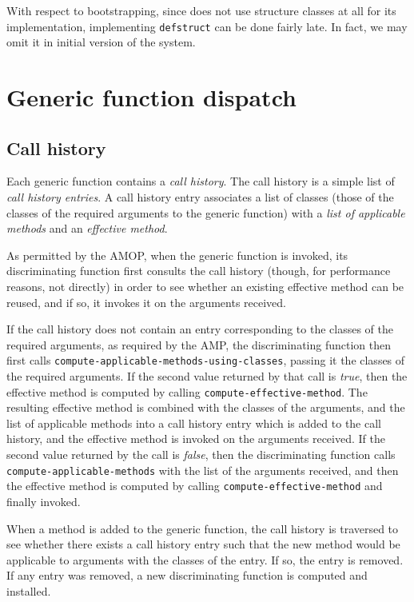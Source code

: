 With respect to bootstrapping, since \sysname{} does not use structure
classes at all for its implementation, implementing \texttt{defstruct}
can be done fairly late.  In fact, we may omit it in initial version
of the system. 

\section{Generic function dispatch}
\label{sec-generic-function-dispatch}

\subsection{Call history}
\label{sec-generic-function-dispatch-call-history}

Each generic function contains a \emph{call history}.  The call
history is a simple list of \emph{call history entries}.  A call
history entry associates a list of classes (those of the classes of
the required arguments to the generic function) with a \emph{list of
  applicable methods} and an \emph{effective method}.

As permitted by the AMOP, when the generic function is invoked, its
discriminating function first consults the call history (though, for
performance reasons, not directly) in order to see whether an existing
effective method can be reused, and if so, it invokes it on the
arguments received.

If the call history does not contain an entry corresponding to the
classes of the required arguments, as required by the AMP, the
discriminating function then first calls
\texttt{compute-applicable-methods-using-classes}, passing it the
classes of the required arguments.  If the second value returned by
that call is \textit{true}, then the effective method is computed by
calling \texttt{compute-effective-method}.  The resulting effective
method is combined with the classes of the arguments, and the list of
applicable methods into a call history entry which is added to the
call history, and the effective method is invoked on the arguments
received.  If the second value returned by the call is \textit{false},
then the discriminating function calls
\texttt{compute-applicable-methods} with the list of the arguments
received, and then the effective method is computed by calling
\texttt{compute-effective-method} and finally invoked.

When a method is added to the generic function, the call history is
traversed to see whether there exists a call history entry such that
the new method would be applicable to arguments with the classes of
the entry.  If so, the entry is removed.  If any entry was removed, a
new discriminating function is computed and installed. 

